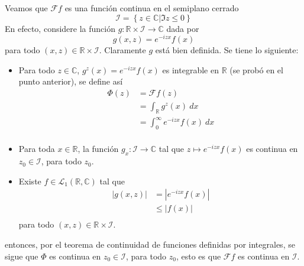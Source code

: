 \documentclass[12pt]{report}
\theoremstyle{largebreak}
\renewcommand{\leq}{\ensuremath{\leqslant}}
\newcommand\abs[1]{\ensuremath{\left|#1\right|}}
\newcommand\cf[3]{\ensuremath{#1:#2\rightarrow#3}}
\newcommand{\fou}[1]{\ensuremath{\mathcal{F}#1}}
\begin{document}
\begin{sol}
        Veamos que $\fou{f}$ es una función continua en el semiplano cerrado
        \begin{equation*}
            \mathcal{I}=\left\{z\in\mathbb{C}\Big|\Im z\leq0 \right\}
        \end{equation*}
        En efecto, considere la función $\cf{g}{\mathbb{R}\times\mathcal{I}}{\mathbb{C}}$ dada por
        \begin{equation*}
            g(x,z)=e^{ -izx}f(x)
        \end{equation*}
        para todo $(x,z)\in\mathbb{R}\times\mathcal{I}$. Claramente $g$ está bien definida. Se tiene lo siguiente:
        \begin{itemize}
            \item Para todo $z\in\mathbb{C}$, $g^z(x)=e^{ -izx}f(x)$ es integrable en $\mathbb{R}$ (se probó en el punto anterior), se define así
            \begin{equation*}
                \begin{split}
                    \Phi(z)&=\fou{f}(z)\\
                    &=\int_{\mathbb{R}}g^z(x)\:dx\\
                    &=\int_0^{\infty}e^{-izx}f(x)\:dx\\
                \end{split}
            \end{equation*}
            \item Para toda $x\in\mathbb{R}$, la función $\cf{g_x}{\mathcal{I}}{\mathbb{C}}$ tal que $z\mapsto e^{ -izx}f(x)$ es continua en $z_0\in\mathcal{I}$, para todo $z_0$.
            \item Existe $f\in\mathcal{L}_1(\mathbb{R},\mathbb{C})$ tal que
            \begin{equation*}
                \begin{split}
                    \abs{g(x,z)}&=\abs{e^{ -izx}f(x)}\\
                    &\leq\abs{f(x)}\\
                \end{split}
            \end{equation*}
            para todo $(x,z)\in\mathbb{R}\times\mathcal{I}$.
        \end{itemize}
        entonces, por el teorema de continuidad de funciones definidas por integrales, se sigue que $\Phi$ es continua en $z_0\in\mathcal{I}$, para todo $z_0$, esto es que $\fou{f}$ es continua en $\mathcal{I}$.


\end{sol}
\end{document}
